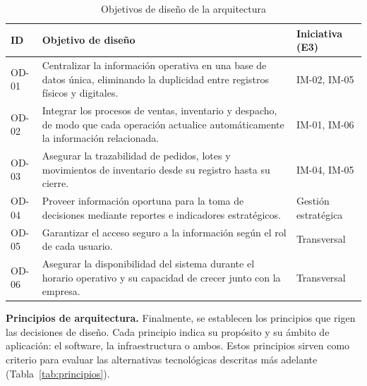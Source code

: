 \begin{table}[H]
\centering
\caption{Objetivos de diseño de la arquitectura}
\label{tab:objetivos-diseno}
\small
\renewcommand{\arraystretch}{1.3}
\begin{tabularx}{\textwidth}{|>{\centering\arraybackslash}p{1.2cm}|X|>{\centering\arraybackslash}p{2.4cm}|}
\hline
\textbf{ID} & \textbf{Objetivo de diseño} & \textbf{Iniciativa (E3)} \\
\hline
OD-01 & Centralizar la información operativa en una base de datos única, eliminando la duplicidad entre registros físicos y digitales. & IM-02, IM-05 \\
\hline
OD-02 & Integrar los procesos de ventas, inventario y despacho, de modo que cada operación actualice automáticamente la información relacionada. & IM-01, IM-06 \\
\hline
OD-03 & Asegurar la trazabilidad de pedidos, lotes y movimientos de inventario desde su registro hasta su cierre. & IM-04, IM-05 \\
\hline
OD-04 & Proveer información oportuna para la toma de decisiones mediante reportes e indicadores estratégicos. & Gestión estratégica \\
\hline
OD-05 & Garantizar el acceso seguro a la información según el rol de cada usuario. & Transversal \\
\hline
OD-06 & Asegurar la disponibilidad del sistema durante el horario operativo y su capacidad de crecer junto con la empresa. & Transversal \\
\hline
\end{tabularx}
\end{table}

\textbf{Principios de arquitectura.} Finalmente, se establecen los principios que rigen las decisiones de diseño. Cada principio indica su propósito y su ámbito de aplicación: el software, la infraestructura o ambos. Estos principios sirven como criterio para evaluar las alternativas tecnológicas descritas más adelante (Tabla~\ref{tab:principios}).


